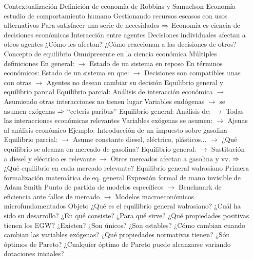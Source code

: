 \documentclass{nuevotema}
\begin{document}
\begin{esquemal}
	\1[] 
		\2 Contextualización
			\3 Definición de economía de Robbins y Samuelson
				\4 Economía estudio de comportamiento humano
				\4[] Gestionando recursos escasos con usos alternativos
				\4[] Para satisfacer una serie de necesidades
				\4[] $\Rightarrow$ Economía es ciencia de decisiones económicas
			\3 Interacción entre agentes
				\4 Decisiones individuales afectan a otros agentes
				\4[$\to$] ¿Cómo les afectan?
				\4[$\to$] ¿Cómo reaccionan a las decisiones de otros?
				\4 Concepto de equilibrio
				\4[] Omnipresente en la ciencia económica
				\4[] Múltiples definiciones
				\4[] En general:
				\4[] $\to$ Estado de un sistema en reposo
				\4[] En términos económicos:
				\4[] Estado de un sistema en que:
				\4[] $\to$ Decisiones son compatibles unas con otras
				\4[] $\to$ Agentes no desean cambiar su decisión
			\3 Equilibrio general y equilibrio parcial
				\4 Equilibrio parcial:
				\4[] Análisis de interacción económica
				\4[] $\to$ Asumiendo otras interacciones no tienen lugar
				\4[] Variables endógenas
				\4[] $\to$ se asumen exógenas
				\4[] $\Rightarrow$ ``ceteris paribus''
				\4 Equilibrio general:
				\4[] Análisis de:
				\4[] $\to$ Todas las interacciones económicas relevantes
				\4[] Variables exógenas se asumen:
				\4[] $\to$ Ajenas al análisis económico
				\4 Ejemplo:
				\4[] Introducción de un impuesto sobre gasolina
				\4[] Equilibrio parcial:
				\4[] $\to$ Asume constante diesel, eléctrico, plásticos...
				\4[] $\to$ ¿Qué equilibrio se alcanza en mercado de gasolina?
				\4[] Equilibrio general:
				\4[] $\to$ Sustitución a diesel y eléctrico es relevante
				\4[] $\to$ Otros mercados afectan a gasolina y vv.
				\4[] $\Rightarrow$ ¿Qué equilibrio en cada mercado relevante?
				\4 Equilibrio general walrasiano
				\4[] Primera formalización matemática de eq. general
				\4[] Expresión formal de mano invisible de Adam Smith
				\4[] Punto de partida de modelos específicos
				\4[] $\to$ Benchmark de eficiencia ante fallos de mercado
				\4[] $\to$ Modelos macroeconómicos microfundamentados
		\2 Objeto
			\3 ¿Qué es el equilibrio general walrasiano?
				\4 ¿Cuál ha sido su desarrollo?
				\4 ¿En qué consiste?
				\4 ¿Para qué sirve?
			\3 ¿Qué propiedades positivas tienen los EGW?
				\4 ¿Existen?
				\4 ¿Son únicos?
				\4 ¿Son estables?
				\4 ¿Cómo cambian cuando cambian las variables exógenas?
			\3 ¿Qué propiedades normativas tienen?
				\4 ¿Són óptimos de Pareto?
				\4 ¿Cualquier óptimo de Pareto puede alcanzarse variando dotaciones iniciales?

\end{esquemal}
\end{document}
